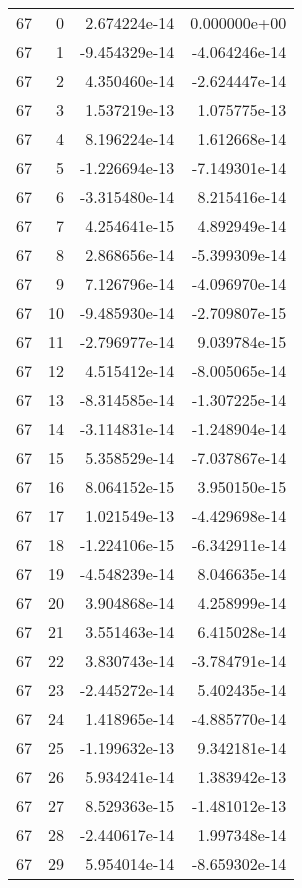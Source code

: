 \begin{tabular}{rrrr}
  67 &    0 &  2.674224e-14 &  0.000000e+00 \\
  67 &    1 & -9.454329e-14 & -4.064246e-14 \\
  67 &    2 &  4.350460e-14 & -2.624447e-14 \\
  67 &    3 &  1.537219e-13 &  1.075775e-13 \\
  67 &    4 &  8.196224e-14 &  1.612668e-14 \\
  67 &    5 & -1.226694e-13 & -7.149301e-14 \\
  67 &    6 & -3.315480e-14 &  8.215416e-14 \\
  67 &    7 &  4.254641e-15 &  4.892949e-14 \\
  67 &    8 &  2.868656e-14 & -5.399309e-14 \\
  67 &    9 &  7.126796e-14 & -4.096970e-14 \\
  67 &   10 & -9.485930e-14 & -2.709807e-15 \\
  67 &   11 & -2.796977e-14 &  9.039784e-15 \\
  67 &   12 &  4.515412e-14 & -8.005065e-14 \\
  67 &   13 & -8.314585e-14 & -1.307225e-14 \\
  67 &   14 & -3.114831e-14 & -1.248904e-14 \\
  67 &   15 &  5.358529e-14 & -7.037867e-14 \\
  67 &   16 &  8.064152e-15 &  3.950150e-15 \\
  67 &   17 &  1.021549e-13 & -4.429698e-14 \\
  67 &   18 & -1.224106e-15 & -6.342911e-14 \\
  67 &   19 & -4.548239e-14 &  8.046635e-14 \\
  67 &   20 &  3.904868e-14 &  4.258999e-14 \\
  67 &   21 &  3.551463e-14 &  6.415028e-14 \\
  67 &   22 &  3.830743e-14 & -3.784791e-14 \\
  67 &   23 & -2.445272e-14 &  5.402435e-14 \\
  67 &   24 &  1.418965e-14 & -4.885770e-14 \\
  67 &   25 & -1.199632e-13 &  9.342181e-14 \\
  67 &   26 &  5.934241e-14 &  1.383942e-13 \\
  67 &   27 &  8.529363e-15 & -1.481012e-13 \\
  67 &   28 & -2.440617e-14 &  1.997348e-14 \\
  67 &   29 &  5.954014e-14 & -8.659302e-14 \\

\end{tabular}
